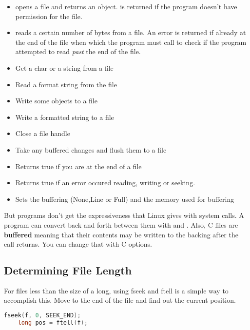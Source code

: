 \begin{itemize}
	\item {} opens a file and returns an object.  is returned if the program doesn't have permission for the file.
	\item {} reads a certain number of bytes from a file. An error is returned if already at the end of the file when which the program must call  to check if the program attempted to read \textit{past} the end of the file.
	\item {} Get a char or a string from a file
	\item {} Read a format string from the file
	\item {} Write some objects to a file
	\item {} Write a formatted string to a file
	\item {} Close a file handle
	\item {} Take any buffered changes and flush them to a file
	\item {} Returns true if you are at the end of a file
 	\item {} Returns true if an error occured reading, writing or seeking.
  	\item {} Sets the buffering (None,Line or Full) and the memory used for buffering
\end{itemize}
	 
But programs don't get the expressiveness that Linux gives with system calls.
A program can convert back and forth between them with  and .
Also, C files are \textbf{buffered} meaning that their contents may be written to the backing after the call returns.
You can change that with C options.
	  
\subsection{Determining File Length}
	 
For files less than the size of a long, using fseek and ftell is a
simple way to accomplish this.
Move to the end of the file and find out the current position.
	 
\begin{lstlisting}[language=C]
	fseek(f, 0, SEEK_END);
	long pos = ftell(f);
\end{lstlisting}
	 
